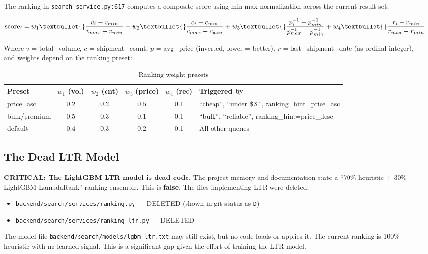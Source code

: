 \documentclass[12pt,a4paper]{article}
\begin{document}
The ranking in \texttt{search\_service.py:617} computes a composite score using
min-max normalization across the current result set:

\begin{equation}
\text{score}_i = w_1 \textbullet{} \frac{v_i - v_{min}}{v_{max} - v_{min}}
               + w_2 \textbullet{} \frac{c_i - c_{min}}{c_{max} - c_{min}}
               + w_3 \textbullet{} \frac{p^{-1}_i - p^{-1}_{min}}{p^{-1}_{max} - p^{-1}_{min}}
               + w_4 \textbullet{} \frac{r_i - r_{min}}{r_{max} - r_{min}}
\end{equation}

Where $v$ = total\_volume, $c$ = shipment\_count, $p$ = avg\_price (inverted, lower = better),
$r$ = last\_shipment\_date (as ordinal integer), and weights depend on the ranking preset:

\begin{table}[H]
\centering
\renewcommand{\arraystretch}{1.3}
\begin{tabular}{lccccl}
\toprule
\textbf{Preset} & $w_1$ (vol) & $w_2$ (cnt) & $w_3$ (price) & $w_4$ (rec) & \textbf{Triggered by} \\
\midrule
price\_asc & 0.2 & 0.2 & 0.5 & 0.1 & ``cheap'', ``under \$X'', ranking\_hint=price\_asc \\
bulk/premium & 0.5 & 0.3 & 0.1 & 0.1 & ``bulk'', ``reliable'', ranking\_hint=price\_desc \\
default & 0.4 & 0.3 & 0.2 & 0.1 & All other queries \\
\bottomrule
\end{tabular}
\caption{Ranking weight presets}
\end{table}

\subsection{The Dead LTR Model}

\begin{issueBox}
\textbf{CRITICAL: The LightGBM LTR model is dead code.}
The project memory and documentation state a ``70\% heuristic + 30\% LightGBM LambdaRank''
ranking ensemble. This is \textbf{false}. The files implementing LTR were deleted:
\begin{itemize}
  \item \texttt{backend/search/services/ranking.py} --- DELETED (shown in git status as \texttt{D})
  \item \texttt{backend/search/services/ranking\_ltr.py} --- DELETED
\end{itemize}
The model file \texttt{backend/search/models/lgbm\_ltr.txt} may still exist, but no
code loads or applies it. The current ranking is 100\% heuristic with no learned signal.
This is a significant gap given the effort of training the LTR model.
\end{issueBox}
\end{document}
